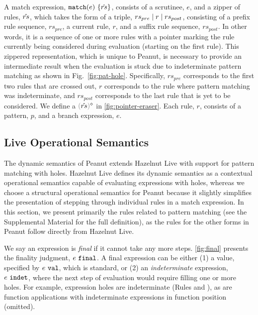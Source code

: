 A match expression, $\mathtt{match}(e)~\{\hat{rs}\}$, 
consists of a scrutinee, $e$, and a zipper of rules, $\hat{rs}$, which takes the form of a triple, $rs_{pre} \mid r \mid rs_{post}$, consisting of a prefix rule sequence, $rs_{pre}$, a current rule, $r$, and a suffix rule sequence, $rs_{post}$. In other words, it is a sequence of one or more rules with a pointer marking the rule currently being considered during evaluation (starting on the first rule). This zippered representation, which is unique to Peanut, is necessary to provide an intermediate result when the evaluation is stuck due to indeterminate pattern matching as shown in Fig.~\ref{fig:pat-hole}. Specifically, $rs_{pre}$ corresponds to the first two rules that are crossed out, $r$ corresponds to the rule where pattern matching was indeterminate, and $rs_{post}$ corresponds to the last rule that is yet to be considered. We define a  $\rmpointer{\zrules}$ in \autoref{fig:pointer-eraser}. 
Each rule, $r$, consists of a pattern, $p$, and a branch expression, $e$.

\subsection{Live Operational Semantics}\label{sec:dynamics}


The dynamic semantics of Peanut extends Hazelnut Live \cite{DBLP:journals/pacmpl/OmarVCH19} with support for pattern matching with holes. Hazelnut Live defines its dynamic semantics as a contextual operational  semantics \cite{DBLP:conf/ppdp/PientkaD08} capable of evaluating expressions with holes, whereas we choose a structural operational semantics \cite{DBLP:journals/jlp/Plotkin04a} for Peanut because it slightly simplifies the presentation of stepping through individual rules in a match expression. In this section, we present primarily the rules related to pattern matching (see the Supplemental Material for the full definition), as the rules for the other forms in Peanut follow directly from Hazelnut Live. 




We say an expression is \textit{final} if it cannot take any more steps. \autoref{fig:final} presents the finality judgment, $e ~\mathtt{final}$. A final expression can be either (1) a value, specified by $e ~\mathtt{val}$, which is standard, or (2) an  \emph{indeterminate} expression, $e ~\mathtt{indet}$, where the next step of evaluation would require filling one or more holes. For example, expression holes are indeterminate (Rules \IEHole and \IHole), as are function applications with indeterminate expressions in function position (omitted). 



